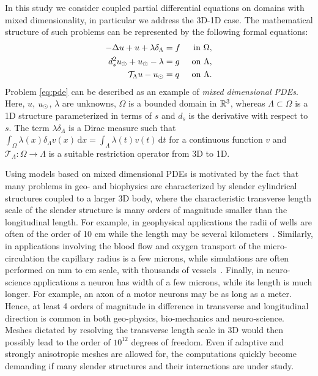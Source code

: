 \documentclass[r]{siamart171218}
\newcommand{\paolo}[1]{{\color{black}#1}}
\begin{document}
In this study we consider coupled partial differential equations on domains with mixed dimensionality, in particular we address the  3D-1D case. The mathematical structure of such problems can be represented by the following formal equations:
\begin{subequations}
\label{eq:pde}
\begin{align}
\label{eq:pde1}
  -\Delta u + u + \lambda \delta_{\Lambda} &= f &\mbox{ in } \Omega,\\
\label{eq:pde2}
 d_s^2 \ud + \ud - \lambda &= g &\mbox{ on } \Lambda,\\
\label{eq:coupling}
\mathcal{T}_\Lambda u - \ud  &=  \paolo{q} &\mbox{ on } \Lambda . 
\end{align}
\end{subequations}
Problem \eqref{eq:pde} can be described as an example of \emph{mixed dimensional PDEs}.
Here, $u$, $u_{\odot}$,  $\lambda$ are unknowns,  $\Omega$ is a bounded domain in $\mathbb{R}^3$, whereas $\Lambda \subset \Omega$ is a 1D structure
parameterized in terms of $s$ and $d_s$ is the derivative with respect to $s$. 
The term $\lambda\delta_{\Lambda}$ is a Dirac measure such that 
$\int_{\Omega}\lambda(x)\delta_{\Lambda}v(x)\,\mathrm{d}x=\int_{\Lambda}\lambda(t)v(t) \,\mathrm{d}t$
for a continuous function $v$ and $\mathcal{T}_\Lambda: \Omega\rightarrow\Lambda$ is a suitable restriction operator from 3D to 1D. 

Using models based on mixed dimensional PDEs is motivated by the fact that many problems in geo- and biophysics are characterized by slender cylindrical structures coupled to a larger 3D body, where the characteristic transverse length scale of the slender structure is many orders of magnitude smaller than the longitudinal length.  For example, in geophysical applications the radii of wells are often of the order of 10 cm while the length may be several kilometers~\cite{Peaceman1978183, Peaceman1983531}. Similarly, in applications involving the blood flow and oxygen transport of the micro-circulation the capillary radius is a few microns, while simulations are often performed on mm to cm scale, with thousands of vessels~\cite{berg2020modelling,fang2008oxygen,gould2017capillary, secomb2004green}. Finally, in neuro-science applications a neuron has width of a few microns, while  its length is much longer. For example, an axon of a motor neurons may be as long as a meter.  Hence,  at least 4 orders of magnitude in difference in transverse and longitudinal direction is common in both geo-physics, bio-mechanics and neuro-science. Meshes dictated by resolving the transverse length scale in 3D would then possibly lead to the order of $10^{12}$ degrees of freedom. Even if adaptive and strongly anisotropic meshes are allowed for, the computations quickly become demanding if many slender structures and their interactions are under study.  
\end{document}
